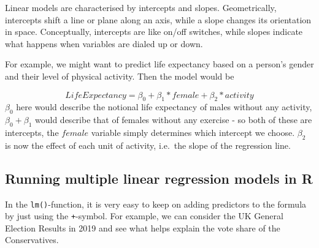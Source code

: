 \documentclass[
]{book}
\newenvironment{Shaded}{\begin{snugshade}}{\end{snugshade}}
\newcommand{\CommentTok}[1]{\textcolor[rgb]{0.56,0.35,0.01}{\textit{#1}}}
\newcommand{\DataTypeTok}[1]{\textcolor[rgb]{0.13,0.29,0.53}{#1}}
\newcommand{\KeywordTok}[1]{\textcolor[rgb]{0.13,0.29,0.53}{\textbf{#1}}}
\newcommand{\NormalTok}[1]{#1}
\newcommand{\OperatorTok}[1]{\textcolor[rgb]{0.81,0.36,0.00}{\textbf{#1}}}
\newcommand{\StringTok}[1]{\textcolor[rgb]{0.31,0.60,0.02}{#1}}
\begin{document}
Linear models are characterised by intercepts and slopes. Geometrically,
intercepts shift a line or plane along an axis, while a slope changes
its orientation in space. Conceptually, intercepts are like on/off
switches, while slopes indicate what happens when variables are dialed
up or down.

For example, we might want to predict life expectancy based on a
person's gender and their level of physical activity. Then the model
would be

\[LifeExpectancy=\beta_{0} +  \beta_{1}*female + \beta_{2}*activity\]
\(\beta_{0}\) here would describe the notional life expectancy of males
without any activity, \(\beta_{0}+\beta_{1}\) would describe that of
females without any exercise - so both of these are intercepts, the
\(female\) variable simply determines which intercept we choose.
\(\beta_{2}\) is now the effect of each unit of activity, i.e.~the slope
of the regression line.

\hypertarget{running-multiple-linear-regression-models-in-r}{%
\subsection{Running multiple linear regression models in R}\label{running-multiple-linear-regression-models-in-r}}

In the \texttt{lm()}-function, it is very easy to keep on adding predictors to
the formula by just using the \texttt{+}-symbol. For example, we can consider
the UK General Election Results in 2019 and see what helps explain the
vote share of the Conservatives.

\begin{Shaded}
\end{Shaded}
\end{document}

